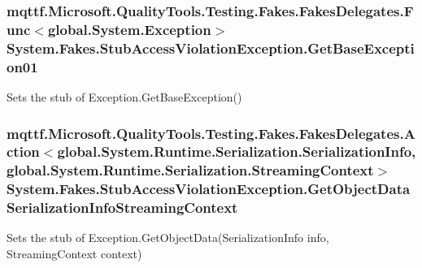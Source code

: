 \hypertarget{class_system_1_1_fakes_1_1_stub_access_violation_exception_aff4c53b07bade4566b3ab66947c5570b}{
\subsubsection[{Get\-Base\-Exception01}]{\setlength{\rightskip}{0pt plus 5cm}mqttf.\-Microsoft.\-Quality\-Tools.\-Testing.\-Fakes.\-Fakes\-Delegates.\-Func$<$global.\-System.\-Exception$>$ System.\-Fakes.\-Stub\-Access\-Violation\-Exception.\-Get\-Base\-Exception01}}\label{class_system_1_1_fakes_1_1_stub_access_violation_exception_aff4c53b07bade4566b3ab66947c5570b}


Sets the stub of Exception.\-Get\-Base\-Exception()

\hypertarget{class_system_1_1_fakes_1_1_stub_access_violation_exception_ad4d0403a964c94acb237617aba03b007}{
\subsubsection[{Get\-Object\-Data\-Serialization\-Info\-Streaming\-Context}]{\setlength{\rightskip}{0pt plus 5cm}mqttf.\-Microsoft.\-Quality\-Tools.\-Testing.\-Fakes.\-Fakes\-Delegates.\-Action$<$global.\-System.\-Runtime.\-Serialization.\-Serialization\-Info, global.\-System.\-Runtime.\-Serialization.\-Streaming\-Context$>$ System.\-Fakes.\-Stub\-Access\-Violation\-Exception.\-Get\-Object\-Data\-Serialization\-Info\-Streaming\-Context}}\label{class_system_1_1_fakes_1_1_stub_access_violation_exception_ad4d0403a964c94acb237617aba03b007}


Sets the stub of Exception.\-Get\-Object\-Data(\-Serialization\-Info info, Streaming\-Context context)

